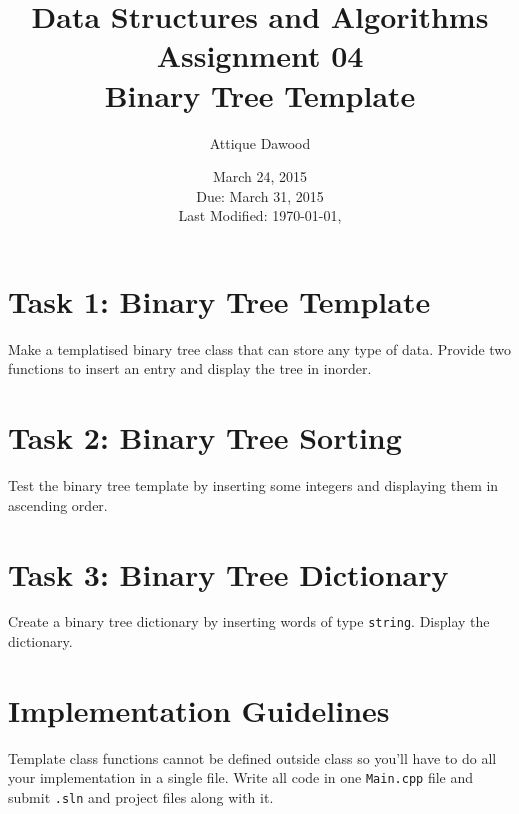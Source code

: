 \documentclass[12pt,a4paper]{article}
\title{Data Structures and Algorithms\\Assignment 04\\Binary Tree Template}
\author{Attique Dawood}
\date{March 24, 2015\\Due: March 31, 2015\\[0.2cm] Last Modified: \today, \currenttime}
\begin{document}
\maketitle
\section{Task 1: Binary Tree Template}
Make a templatised binary tree class that can store any type of data. Provide two functions to insert an entry and display the tree in inorder.
\section{Task 2: Binary Tree Sorting}
Test the binary tree template by inserting some integers and displaying them in ascending order.
\section{Task 3: Binary Tree Dictionary}
Create a binary tree dictionary by inserting words of type \verb|string|. Display the dictionary.
\section{Implementation Guidelines}
Template class functions cannot be defined outside class so you'll have to do all your implementation in a single file. Write all code in one \verb|Main.cpp| file and submit \verb|.sln| and project files along with it.
\end{document}
